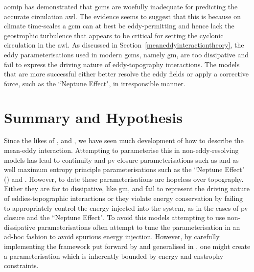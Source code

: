 \documentclass[10pt,a4paper]{report}
\newcommand*\secref[1]{Section~\ref{#1}}
\begin{document}
\Gls{aomip} has demonstrated that \glspl{gcm} are woefully inadequate for predicting the
accurate circulation \gls{awl}. The evidence seems to suggest that this is because on 
climate time-scales a \gls{gcm} can at best be eddy-permitting and hence
lack the geostrophic turbulence that appears to be critical for setting the 
cyclonic circulation in the \gls{awl}. As discussed in \secref{meaneddyinteractiontheory},
the eddy parameterisations used in modern \glspl{gcm}, namely \gls{gm}, are too 
dissipative and fail to express the driving nature of eddy-topography interactions. 
The models that are more successful either better resolve the eddy fields or apply 
a corrective force, such as the ``Neptune Effect", in irresponsible manner. 

\section{Summary and Hypothesis}

Since the likes of \cite{young1982shear}, \cite{holloway1987systematic} and
\cite{gent1990}, we have seen much development of how to describe the mean-eddy interaction.
Attempting to parameterise this in non-eddy-resolving models has lead to 
continuity and \gls{pv} closure parameterisations such as \cite{gent1990}
and \cite{greatbatch1998exploring} as well maximum entropy principle parameterisations 
such as the ``Neptune Effect" (\cite{holloway1992representing}) and \cite{polyakov2001eddy}.
However, to date these parameterisations are hopeless over topography. Either
they are far to dissipative, like \gls{gm}, and fail to represent the driving nature
of eddies-topographic interactions or they violate energy conservation
by failing to appropriately control the energy injected into the system, as in the cases
of \gls{pv} closure and the ``Neptune Effect". To avoid this models attempting to
use non-dissipative parameterisations often attempt to tune the parameterisation in
an ad-hoc fashion to avoid spurious energy injection. However, by carefully implementing
the framework put forward by \cite{marshall2012framework} and generalised in
\cite{maddison2013eliassen}, one might create a parameterisation which is
inherently bounded by energy and enstrophy constraints.
\end{document}
